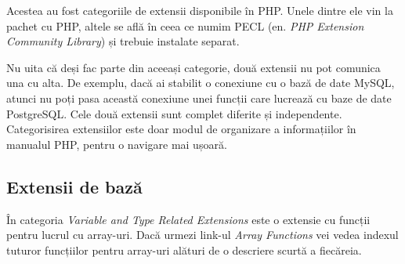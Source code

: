 Acestea au fost categoriile de extensii disponibile în PHP.
Unele dintre ele vin la pachet cu PHP, altele se află
în ceea ce numim PECL (en. \textsl{PHP Extension Community Library})
și trebuie instalate separat.

Nu uita că deși fac parte din aceeași categorie, două extensii nu
pot comunica una cu alta. De exemplu, dacă ai stabilit o conexiune
cu o bază de date MySQL, atunci nu poți pasa această conexiune
unei funcții care lucrează cu baze de date PostgreSQL. Cele două
extensii sunt complet diferite și independente. Categorisirea
extensiilor este doar modul de organizare a informațiilor în
manualul PHP, pentru o navigare mai ușoară.


\subsection{Extensii de bază}
În categoria \textit{Variable and Type Related Extensions}
este o extensie cu funcții pentru lucrul cu array-uri.
Dacă urmezi link-ul \textit{Array Functions} vei vedea
indexul tuturor funcțiilor pentru array-uri alături de
o descriere scurtă a fiecăreia.

